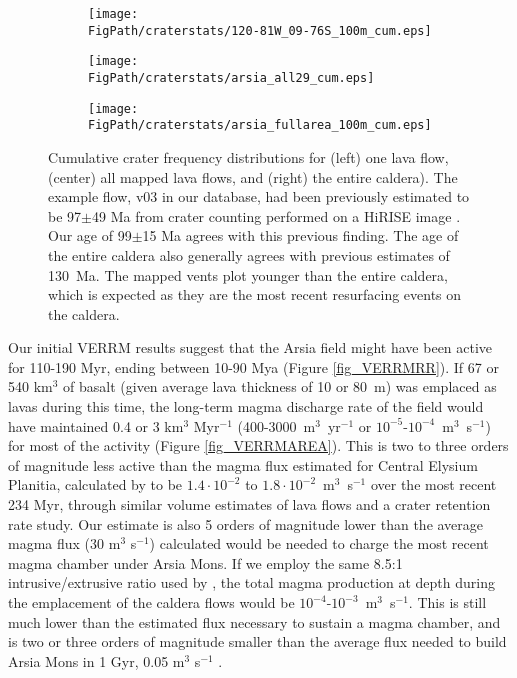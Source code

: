 \begin{figure}
\centering
\begin{subfigure}{.32\textwidth}
  \texttt{[image: \\FigPath/craterstats/120-81W\_09-76S\_100m\_cum.eps]}
\end{subfigure}
\begin{subfigure}{.32\textwidth}
  \texttt{[image: \\FigPath/craterstats/arsia\_all29\_cum.eps]}
\end{subfigure}
\begin{subfigure}{.32\textwidth}
  \texttt{[image: \\FigPath/craterstats/arsia\_fullarea\_100m\_cum.eps]}
\end{subfigure}
\caption[Cumulative crater frequency distributions for one lava flow, all mapped lava flows, and the entire caldera)]{Cumulative crater frequency distributions for (left) one lava flow, (center) all mapped lava flows, and (right) the entire caldera). The example flow, v03 in our database, had been previously estimated to be 97$\pm$49 Ma from crater counting performed on a HiRISE image \citep{robbins2011volcanic}. Our age of 99$\pm$15 Ma agrees with this previous finding. The age of the entire caldera also generally agrees with previous estimates of 130~Ma. The mapped vents plot younger than the entire caldera, which is expected as they are the most recent resurfacing events on the caldera.}
\label{fig_craterct}
\end{figure}

Our initial VERRM results suggest that the Arsia field might have been active for 110-190 Myr, ending between 10-90 Mya (Figure \ref{fig_VERRMRR}). If 67 or 540 km$^3$ of basalt (given average lava thickness of 10 or 80~m) was emplaced as lavas during this time, the long-term magma discharge rate of the field would have maintained 0.4 or 3 km$^3$ Myr$^{-1}$ (400-3000~m$^3$~yr$^{-1}$ or $10^{-5}$-$10^{-4}$~m$^3$~s$^{-1}$) for most of the activity (Figure \ref{fig_VERRMAREA}). This is two to three orders of magnitude less active than the magma flux estimated for Central Elysium Planitia, calculated by \citet{vaucher2009volcanic} to be $1.4\cdot 10^{-2}$ to $1.8\cdot 10^{-2}$~m$^3$~s$^{-1}$ over the most recent 234 Myr, through similar volume estimates of lava flows and a crater retention rate study. Our estimate is also 5 orders of magnitude lower than the average magma flux (30 m$^3$ s$^{-1}$) \citet{wilson2001evidence} calculated would be needed to charge the most recent magma chamber under Arsia Mons. If we employ the same 8.5:1 intrusive/extrusive ratio used by \citet{greeley1991magma}, the total magma production at depth during the emplacement of the caldera flows would be $10^{-4}$-$10^{-3}$~m$^3$~s$^{-1}$. This is still much lower than the estimated flux necessary to sustain a magma chamber, and is two or three orders of magnitude smaller than the average flux needed to build Arsia Mons in 1 Gyr, 0.05 m$^3$ s$^{-1}$ \citep{wilson2001evidence}.

